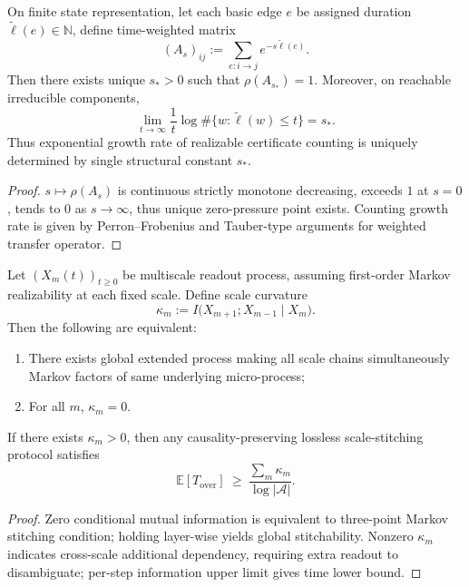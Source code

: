 \begin{theorem}\label{thm:xi-time-weighted-spectral-radius-growth-law}
On finite state representation, let each basic edge \(e\) be assigned duration \(\widetilde\ell(e)\in\mathbb N\), define time-weighted matrix
\[
(A_s)_{ij}:=\sum_{e:i\to j}e^{-s\widetilde\ell(e)}.
\]
Then there exists unique \(s_\ast>0\) such that \(\rho(A_{s_\ast})=1\).
Moreover, on reachable irreducible components,
\[
\lim_{t\to\infty}\frac1t\log \#\{w:\widetilde\ell(w)\le t\}=s_\ast.
\]
Thus exponential growth rate of realizable certificate counting is uniquely determined by single structural constant \(s_\ast\).
\end{theorem}

\begin{proof}
\(s\mapsto \rho(A_s)\) is continuous strictly monotone decreasing, exceeds \(1\) at \(s=0\), tends to \(0\) as \(s\to\infty\), thus unique zero-pressure point exists.
Counting growth rate is given by Perron--Frobenius and Tauber-type arguments for weighted transfer operator.
\end{proof}

\begin{theorem}\label{thm:xi-multiscale-cmi-as-time-curvature}
Let \((X_m(t))_{t\ge 0}\) be multiscale readout process, assuming first-order Markov realizability at each fixed scale.
Define scale curvature
\[
\kappa_m:=I\!\bigl(X_{m+1};X_{m-1}\mid X_m\bigr).
\]
Then the following are equivalent:
\begin{enumerate}
  \item There exists global extended process making all scale chains simultaneously Markov factors of same underlying micro-process;
  \item For all \(m\), \(\kappa_m=0\).
\end{enumerate}
If there exists \(\kappa_m>0\), then any causality-preserving lossless scale-stitching protocol satisfies
\[
\mathbb E[T_{\mathrm{over}}]\ \ge\ \frac{\sum_m \kappa_m}{\log|\mathcal A|}.
\]
\end{theorem}

\begin{proof}
Zero conditional mutual information is equivalent to three-point Markov stitching condition; holding layer-wise yields global stitchability.
Nonzero \(\kappa_m\) indicates cross-scale additional dependency, requiring extra readout to disambiguate; per-step information upper limit gives time lower bound.
\end{proof}


